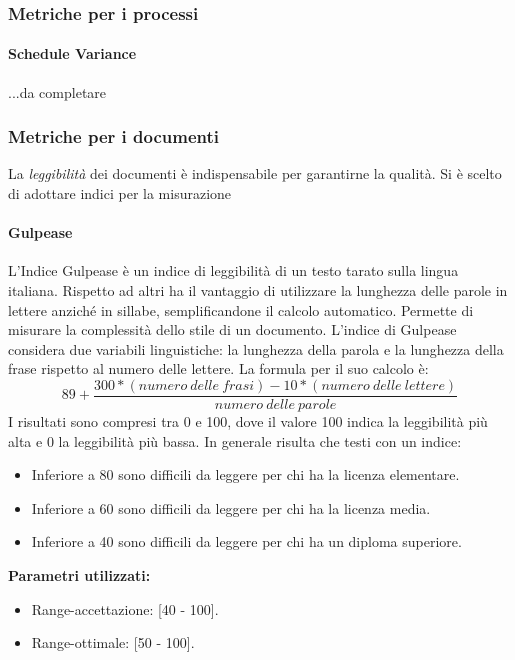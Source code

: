 		\subsubsection{Metriche per i processi}
			\paragraph{Schedule Variance}		
			...da completare	
			
		\subsubsection{Metriche per i documenti}
		La \emph{leggibilità} dei documenti è indispensabile per garantirne la qualità. Si è scelto di adottare indici per la misurazione 
			\paragraph{Gulpease}
			L'Indice Gulpease è un indice di leggibilità di un testo tarato sulla lingua italiana. Rispetto ad altri ha il vantaggio di utilizzare la lunghezza delle parole in lettere anziché in sillabe, semplificandone il calcolo automatico. Permette di misurare la complessità dello stile di un documento.
			L'indice di Gulpease considera due variabili linguistiche: la lunghezza della parola e la lunghezza della frase rispetto al numero delle lettere.
			La formula per il suo calcolo è: \\
			\[
			89 + \frac{300 * (numero\ delle\ frasi) - 10 * (numero\ delle\ lettere)}{numero\ delle\ parole}
			\]
			I risultati sono compresi tra 0 e 100, dove il valore 100 indica la leggibilità più alta e 0 la leggibilità più bassa. In generale risulta che testi con un indice:
			\begin{itemize}
				\item Inferiore a 80 sono difficili da leggere per chi ha la licenza elementare.
				\item Inferiore a 60 sono difficili da leggere per chi ha la licenza media.
				\item Inferiore a 40 sono difficili da leggere per chi ha un diploma superiore.
			\end{itemize}
			\textbf{Parametri utilizzati:}
			\begin{itemize}
				\item Range-accettazione: [40 - 100].
				\item Range-ottimale: [50 - 100].
			\end{itemize}
			
